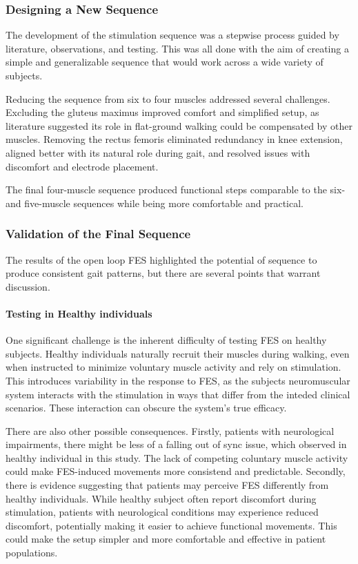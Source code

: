 \subsubsection{Designing a New Sequence}
The development of the stimulation sequence was a stepwise process guided by literature, observations, and testing. This was all done with the aim of creating a simple and generalizable sequence that would work across a wide variety of subjects.

Reducing the sequence from six to four muscles addressed several challenges. Excluding the gluteus maximus improved comfort and simplified setup, as literature suggested its role in flat-ground walking could be compensated by other muscles. Removing the rectus femoris eliminated redundancy in knee extension, aligned better with its natural role during gait, and resolved issues with discomfort and electrode placement.

The final four-muscle sequence produced functional steps comparable to the six- and five-muscle sequences while being more comfortable and practical.

\subsubsection{Validation of the Final Sequence}
The results of the open loop FES highlighted the potential of sequence to produce consistent gait patterns, but there are several points that warrant discussion.
\newline

\paragraph*{Testing in Healthy individuals}

One significant challenge is the inherent difficulty of testing FES on healthy subjects. Healthy individuals naturally recruit their muscles during walking, even when instructed to minimize voluntary muscle activity and rely on stimulation. This introduces variability in the response to FES, as the subjects neuromuscular system interacts with the stimulation in ways that differ from the inteded clinical scenarios. These interaction can obscure the system's true efficacy.

There are also other possible consequences. Firstly, patients with neurological impairments, there might be less of a falling out of sync issue, which observed in healthy individual in this study. The lack of competing coluntary muscle activity could make FES-induced movements more consistend and predictable. Secondly, there is evidence suggesting that patients may perceive FES differently from healthy individuals. While healthy subject often report discomfort during stimulation, patients with neurological conditions may experience reduced discomfort, potentially making it easier to achieve functional movements. This could make the setup simpler and more comfortable and effective in patient populations. 


